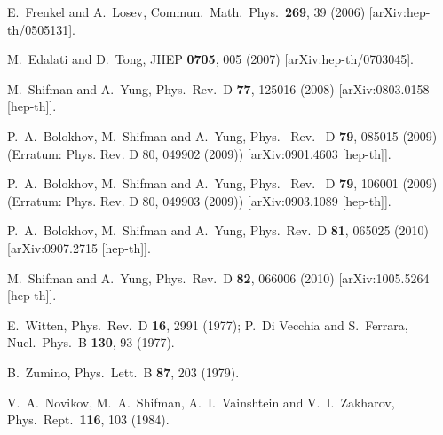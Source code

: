\documentclass[epsfig,12pt]{article}
\begin{document}
{\begin{thebibliography}{99}
E.~Frenkel and A.~Losev,
  Commun.\ Math.\ Phys.\  {\bf 269}, 39 (2006)
  [arXiv:hep-th/0505131].
  
 M.~Edalati and D.~Tong,
  JHEP {\bf 0705}, 005 (2007)
  [arXiv:hep-th/0703045].
  
  M.~Shifman and A.~Yung,
  Phys.\ Rev.\  D {\bf 77}, 125016 (2008)
  [arXiv:0803.0158 [hep-th]].
  
P.~A.~Bolokhov, M.~Shifman and A.~Yung,
  Phys. \ Rev. \ D {\bf 79}, 085015 (2009) (Erratum: Phys. Rev. D 80, 049902 (2009))
  [arXiv:0901.4603 [hep-th]].
  
  P.~A.~Bolokhov, M.~Shifman and A.~Yung,
  Phys. \ Rev. \ D {\bf 79}, 106001 (2009) (Erratum: Phys. Rev. D 80, 049903 (2009))
  [arXiv:0903.1089 [hep-th]].
  
 P.~A.~Bolokhov, M.~Shifman and A.~Yung,
  Phys.\ Rev.\  D {\bf 81}, 065025 (2010)
  [arXiv:0907.2715 [hep-th]].
  
   M.~Shifman and A.~Yung,
  Phys.\ Rev.\ D {\bf 82}, 066006 (2010)
  [arXiv:1005.5264 [hep-th]].
  
  E.~Witten,
  Phys.\ Rev.\  D {\bf 16}, 2991 (1977);
  P.~Di Vecchia and S.~Ferrara,
  Nucl.\ Phys.\  B {\bf 130}, 93 (1977).

 B.~Zumino,
  Phys.\ Lett.\  B {\bf 87}, 203 (1979).

 V.~A.~Novikov, M.~A.~Shifman, A.~I.~Vainshtein and V.~I.~Zakharov,
  Phys.\ Rept.\  {\bf 116}, 103 (1984).
   

\end{thebibliography}}
\end{document}
